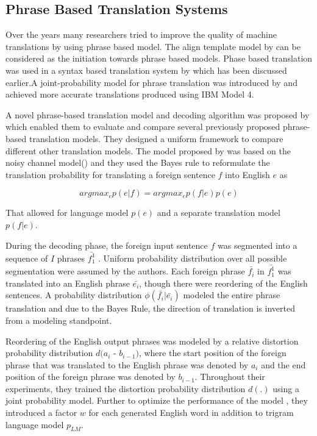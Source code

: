 \subsection{Phrase Based Translation Systems}
Over the years many researchers tried to improve the quality of machine translations by using phrase based model. The align template model by \cite{W99-0604} can be considered as the initiation towards phrase based models. Phase based translation was used in a syntax based translation system by \cite{Yamada:2001:SST:1073012.1073079} which has been discussed earlier.A joint-probability model for phrase translation was introduced by \cite{Marcu:2002:PJP:1118693.1118711} and achieved more accurate translations produced using IBM
Model 4.

A novel phrase-based translation model and decoding algorithm was proposed by \cite{Koehn:2003:SPT:1073445.1073462} which enabled them to evaluate and compare several previously proposed phrase-based translation models. They designed a uniform framework to compare different other translation models. The model proposed by \cite{Koehn:2003:SPT:1073445.1073462} was based on the noisy channel model(\cite{Brown:1993:MSM:972470.972474}) and they used the Bayes rule to reformulate the translation probability for translating a foreign sentence $f$ into English $e$ as

$$
argmax_ep(e|f)= argmax_ep(f|e)p(e)
$$

That allowed for language model $p(e)$ and a separate translation model $p(f|e)$.

During the decoding phase, the foreign input sentence $f$ was segmented into a sequence of $I$ phrases $\bar{f_1^1}$ . Uniform probability distribution over all possible segmentation were assumed by the authors. Each foreign phrase $\bar{f_i}$ in $\bar{f_1^1}$ was translated into an English phrase $\bar{e_i}$, though there were reordering of the English sentences. A probability distribution $\phi(\bar{f_i}|\bar{e_i})$ modeled the entire phrase translation and due to the Bayes Rule, the direction of translation is inverted from a modeling standpoint. 

Reordering of the English output phrases was modeled by a relative distortion probability distribution $d(a_i$ - $b_{i-1})$, where the start position of the foreign phrase that was translated to the English phrase was denoted by $a_i$ and the end position of the foreign phrase was denoted by $b_{i-1}$. Throughout their experiments, they trained the distortion probability distribution $d (.)$ using a joint probability model. Further to optimize the performance of the model , they introduced a factor $w$ for each generated English word in addition to trigram language model $p_{LM}$. 

